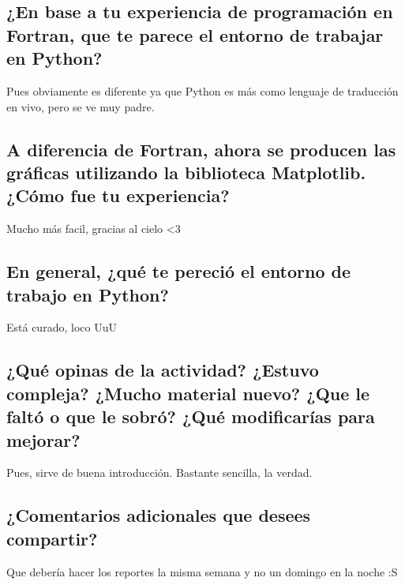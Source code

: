 \documentclass{article}
\begin{document}
\subsection{¿En base a tu experiencia de programación en Fortran, que te parece el entorno de trabajar en Python?}
Pues obviamente es diferente ya que Python es más como lenguaje de traducción en vivo, pero se ve muy padre.
\subsection{A diferencia de Fortran, ahora se producen las gráficas utilizando la biblioteca Matplotlib. ¿Cómo fue tu experiencia?}
Mucho más facil, gracias al cielo <3 
\subsection{En general, ¿qué te pereció el entorno de trabajo en Python?}
Está curado, loco UuU
\subsection{¿Qué opinas de la actividad? ¿Estuvo compleja? ¿Mucho material nuevo? ¿Que le faltó o que le sobró? ¿Qué modificarías para mejorar? }
Pues, sirve de buena introducción. Bastante sencilla, la verdad.
\subsection{¿Comentarios adicionales que desees compartir?}
Que debería hacer los reportes la misma semana y no un domingo en la noche :S
    
\end{document}
